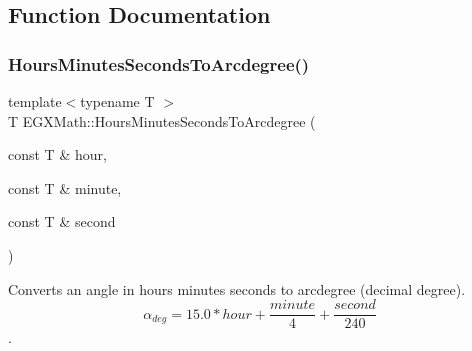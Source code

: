 \subsection{Function Documentation}
\mbox{\label{group___e_g_x_math-_angle_conversions-_hours_minutes_seconds_ga3c38143df47da88534ddbd13726748e2}} 
\subsubsection{\texorpdfstring{Hours\+Minutes\+Seconds\+To\+Arcdegree()}{HoursMinutesSecondsToArcdegree()}}
{\footnotesize\ttfamily template$<$typename T $>$ \\
T E\+G\+X\+Math\+::\+Hours\+Minutes\+Seconds\+To\+Arcdegree (\begin{DoxyParamCaption}\item[{const T \&}]{hour,  }\item[{const T \&}]{minute,  }\item[{const T \&}]{second }\end{DoxyParamCaption})}



Converts an angle in hours minutes seconds to arcdegree (decimal degree). \[\alpha_{deg}=15.0 * hour + \frac{minute}{4} + \frac{second}{240}\]. 

